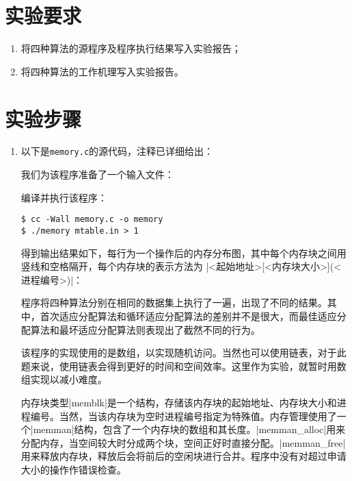 \documentclass[c5size,a4paper,nofonts]{ctexart}
\begin{document}
\section{实验要求}
\begin{enumerate}[label={(\arabic*)}]
\item 将四种算法的源程序及程序执行结果写入实验报告；
\item 将四种算法的工作机理写入实验报告。
\end{enumerate}

\fi

\section{实验步骤}

\begin{enumerate}

\item 以下是{\tt memory.c}的源代码，注释已详细给出：

{\small\linespread{1}}

我们为该程序准备了一个输入文件：


编译并执行该程序：

\begin{Verbatim}[frame=single]
$ cc -Wall memory.c -o memory
$ ./memory mtable.in > 1
\end{Verbatim}

得到输出结果如下，每行为一个操作后的内存分布图，其中每个内存块之间用竖线和空格隔开，每个内存块的表示方法为 |<起始地址>[<内存块大小>](<进程编号>)|：


程序将四种算法分别在相同的数据集上执行了一遍，出现了不同的结果。其中，首次适应分配算法和循环适应分配算法的差别并不是很大，而最佳适应分配算法和最坏适应分配算法则表现出了截然不同的行为。

该程序的实现使用的是数组，以实现随机访问。当然也可以使用链表，对于此题来说，使用链表会得到更好的时间和空间效率。这里作为实验，就暂时用数组实现以减小难度。

内存块类型|memblk|是一个结构，存储该内存块的起始地址、内存块大小和进程编号。当然，当该内存块为空时进程编号指定为特殊值。内存管理使用了一个|memman|结构，包含了一个内存块的数组和其长度。|memman_alloc|用来分配内存，当空间较大时分成两个块，空间正好时直接分配。|memman_free|用来释放内存块，释放后会将前后的空闲块进行合并。程序中没有对超过申请大小的操作作错误检查。


\end{enumerate}
\end{document}
